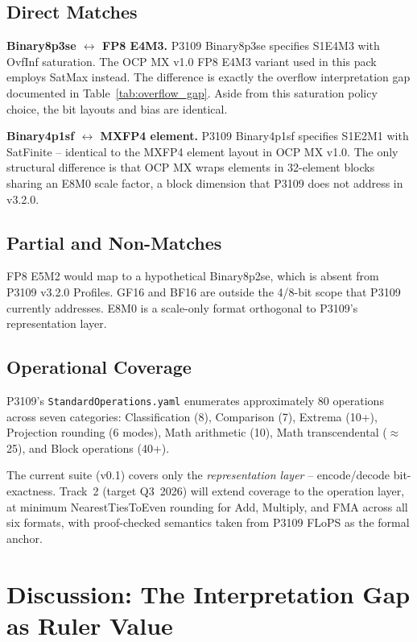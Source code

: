 \documentclass[11pt,letterpaper]{article}
\begin{document}
\subsection{Direct Matches}

\textbf{Binary8p3se $\leftrightarrow$ FP8 E4M3.}
P3109 Binary8p3se specifies S1E4M3 with OvfInf saturation.  The OCP MX v1.0
FP8 E4M3 variant used in this pack employs SatMax instead.  The difference is
exactly the overflow interpretation gap documented in Table~\ref{tab:overflow_gap}.
Aside from this saturation policy choice, the bit layouts and bias are identical.

\textbf{Binary4p1sf $\leftrightarrow$ MXFP4 element.}
P3109 Binary4p1sf specifies S1E2M1 with SatFinite -- identical to the MXFP4
element layout in OCP MX v1.0.  The only structural difference is that OCP MX
wraps elements in 32-element blocks sharing an E8M0 scale factor, a block
dimension that P3109 does not address in v3.2.0.

\subsection{Partial and Non-Matches}

FP8 E5M2 would map to a hypothetical Binary8p2se, which is absent from P3109
v3.2.0 Profiles.  GF16 and BF16 are outside the 4/8-bit scope that P3109
currently addresses.  E8M0 is a scale-only format orthogonal to P3109's
representation layer.

\subsection{Operational Coverage}

P3109's \texttt{StandardOperations.yaml} enumerates approximately 80 operations
across seven categories: Classification (8), Comparison (7), Extrema
(10+), Projection rounding (6 modes), Math arithmetic (10), Math
transcendental ($\approx$25), and Block operations (40+).

The current suite (v0.1) covers only the \emph{representation layer} --
encode/decode bit-exactness.  Track~2 (target Q3~2026) will extend coverage to
the operation layer, at minimum NearestTiesToEven rounding for Add, Multiply,
and FMA across all six formats, with proof-checked semantics taken from
P3109 FLoPS \cite{flops_lean} as the formal anchor.

\section{Discussion: The Interpretation Gap as Ruler Value}
\label{sec:discussion}
\end{document}
